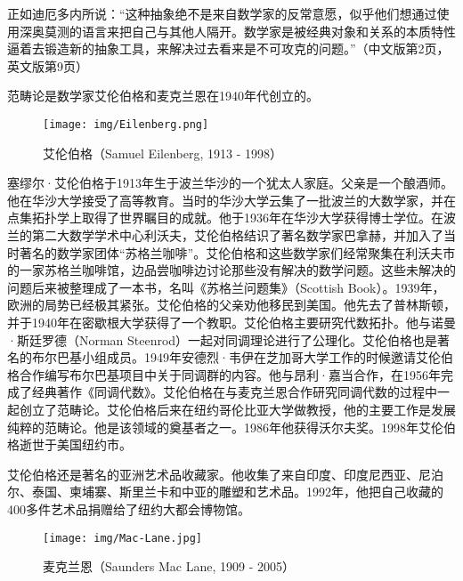 \documentclass{article}
\begin{document}
正如迪厄多内所说：“这种抽象绝不是来自数学家的反常意愿，似乎他们想通过使用深奥莫测的语言来把自己与其他人隔开。数学家是被经典对象和关系的本质特性逼着去锻造新的抽象工具，来解决过去看来是不可攻克的问题。”\cite{Dieudonne1987}（中文版第2页，英文版第9页）

\vspace{5mm}

范畴论是数学家艾伦伯格和麦克兰恩在1940年代创立的。

\begin{figure}[htbp]
 \centering
 \texttt{[image: img/Eilenberg.png]}
 \captionsetup{labelformat=empty}
 \caption{艾伦伯格（Samuel Eilenberg, 1913 - 1998）}
 \label{fig:Eilenberg}
\end{figure}

塞缪尔·艾伦伯格于1913年生于波兰华沙的一个犹太人家庭。父亲是一个酿酒师。他在华沙大学接受了高等教育。当时的华沙大学云集了一批波兰的大数学家，并在点集拓扑学上取得了世界瞩目的成就。他于1936年在华沙大学获得博士学位。在波兰的第二大数学学术中心利沃夫，艾伦伯格结识了著名数学家巴拿赫，并加入了当时著名的数学家团体“苏格兰咖啡”。艾伦伯格和这些数学家们经常聚集在利沃夫市的一家苏格兰咖啡馆，边品尝咖啡边讨论那些没有解决的数学问题。这些未解决的问题后来被整理成了一本书，名叫《苏格兰问题集》（Scottish Book）。1939年，欧洲的局势已经极其紧张。艾伦伯格的父亲劝他移民到美国。他先去了普林斯顿，并于1940年在密歇根大学获得了一个教职。艾伦伯格主要研究代数拓扑。他与诺曼·斯廷罗德（Norman Steenrod）一起对同调理论进行了公理化。艾伦伯格也是著名的布尔巴基小组成员。1949年安德烈·韦伊在芝加哥大学工作的时候邀请艾伦伯格合作编写布尔巴基项目中关于同调群的内容。他与昂利·嘉当合作，在1956年完成了经典著作《同调代数》。艾伦伯格在与麦克兰恩合作研究同调代数的过程中一起创立了范畴论。艾伦伯格后来在纽约哥伦比亚大学做教授，他的主要工作是发展纯粹的范畴论。他是该领域的奠基者之一。1986年他获得沃尔夫奖。1998年艾伦伯格逝世于美国纽约市。

艾伦伯格还是著名的亚洲艺术品收藏家。他收集了来自印度、印度尼西亚、尼泊尔、泰国、柬埔寨、斯里兰卡和中亚的雕塑和艺术品。1992年，他把自己收藏的400多件艺术品捐赠给了纽约大都会博物馆\cite{Wiki-Eilenberg}。

\begin{wrapfigure}{L}{0.35\textwidth}
 \centering
 \texttt{[image: img/Mac-Lane.jpg]}
 \captionsetup{labelformat=empty}
 \caption{麦克兰恩（Saunders Mac Lane, 1909 - 2005）}
 \label{fig:Mac-Lane}
\end{wrapfigure}
\end{document}
